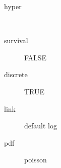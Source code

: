 \begin{description}
	\item[hyper]\ 
	 \item[ survival ] FALSE 
	 \item[ discrete ] TRUE 
	 \item[ link ] default log 
	 \item[ pdf ] poisson 
\end{description}
